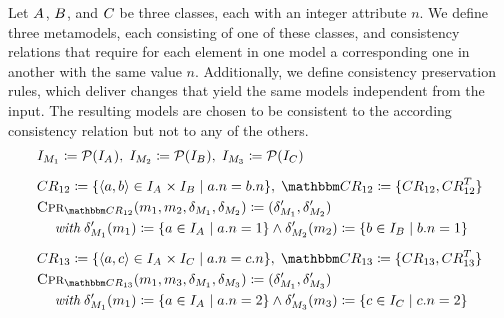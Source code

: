 Let $\class{A}{}$, $\class{B}{}$, and $\class{C}{}$ be three classes, each with an integer attribute $n$.
We define three metamodels, each consisting of one of these classes, and consistency relations that require for each element in one model a corresponding one in another with the same value $n$.
Additionally, we define consistency preservation rules, which deliver changes that yield the same models independent from the input.
The resulting models are chosen to be consistent to the according consistency relation but not to any of the others.
%
\begin{align*}
    & 
    \metamodelinstanceset{M}{1} \equalsperdefinition \mathcal{P}(\instances{\class{A}{}}), \;
    \metamodelinstanceset{M}{2} \equalsperdefinition \mathcal{P}(\instances{\class{B}{}}), \;
    \metamodelinstanceset{M}{3} \equalsperdefinition \mathcal{P}(\instances{\class{C}{}}) \\[0.5em]
    &
    \consistencyrelation{CR}{12} \equalsperdefinition \setted{\tupled{a,b} \in \instances{\class{A}{}} \times \instances{\class{B}{}} \mid a.n = b.n}, \;
    \consistencyrelationset{CR}_{12} \equalsperdefinition \setted{\consistencyrelation{CR}{12}, \consistencyrelation{CR}{12}^T} \\
    &
    \consistencypreservationrule{\consistencyrelationset{CR}_{12}}(\model{m}{1}, \model{m}{2}, \change{\metamodel{M}{1}}, \change{\metamodel{M}{2}}) \equalsperdefinition (\change{\metamodel{M}{1}}', \change{\metamodel{M}{2}}') \\
    & \formulaskip
        \withmath \change{\metamodel{M}{1}}'(\model{m}{1}) \equalsperdefinition \setted{a \in \instances{\class{A}{}} \mid a.n = 1} \land \change{\metamodel{M}{2}}'(\model{m}{2}) \equalsperdefinition \setted{b \in \instances{\class{B}{}} \mid b.n = 1} \\[0.5em]
    &
    \consistencyrelation{CR}{13} \equalsperdefinition \setted{\tupled{a,c} \in \instances{\class{A}{}} \times \instances{\class{C}{}} \mid a.n = c.n}, \;
    \consistencyrelationset{CR}_{13} \equalsperdefinition \setted{\consistencyrelation{CR}{13}, \consistencyrelation{CR}{13}^T} \\
    &
    \consistencypreservationrule{\consistencyrelationset{CR}_{13}}(\model{m}{1}, \model{m}{3}, \change{\metamodel{M}{1}}, \change{\metamodel{M}{3}}) \equalsperdefinition (\change{\metamodel{M}{1}}', \change{\metamodel{M}{3}}') \\
    & \formulaskip
        \withmath \change{\metamodel{M}{1}}'(\model{m}{1}) \equalsperdefinition \setted{a \in \instances{\class{A}{}} \mid a.n = 2} \land \change{\metamodel{M}{3}}'(\model{m}{3}) \equalsperdefinition \setted{c \in \instances{\class{C}{}} \mid c.n = 2} \\[0.5em]

\end{align*}
